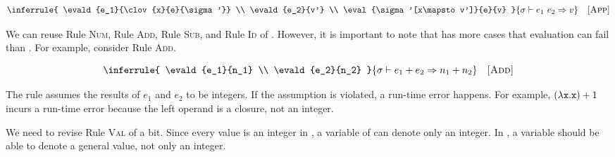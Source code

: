 
\vspace{-1em}

\[
  \inferrule
  {
    \evald{e_1}{\clov{x}{e}{\sigma'}} \\
    \evald{e_2}{v'} \\
    \eval{\sigma'[x\mapsto v']}{e}{v}
  }
  { \evald{\eapp{e_1}{e_2}}{v} }
  \quad\textsc{[App]}
\]

We can reuse Rule \textsc{Num}, Rule \textsc{Add}, Rule \textsc{Sub}, and Rule \textsc{Id} of
\plang. However, it is important to note that \lang has more
cases that evaluation can fail than \plang. For example, consider Rule \textsc{Add}.


\vspace{-1em}

\[
  \inferrule
  {
    \evald{e_1}{n_1} \\
    \evald{e_2}{n_2}
  }
  { \evald{\eadd{e_1}{e_2}}{n_1+n_2} }
  \quad\textsc{[Add]}
\]

The rule assumes the results of $e_1$ and $e_2$ to be integers. If the
assumption is violated, a run-time error happens. For example,
$(\lambda\texttt{x}.\texttt{x})+1$ incurs a run-time error because the left operand
is a closure, not an integer.

We need to revise Rule \textsc{Val} of \plang a bit.
Since every value is an integer in \plang, a variable of \plang can denote only
an integer. In \lang, a variable should be able to denote a general value, not
only an integer.


\vspace{-1em}

